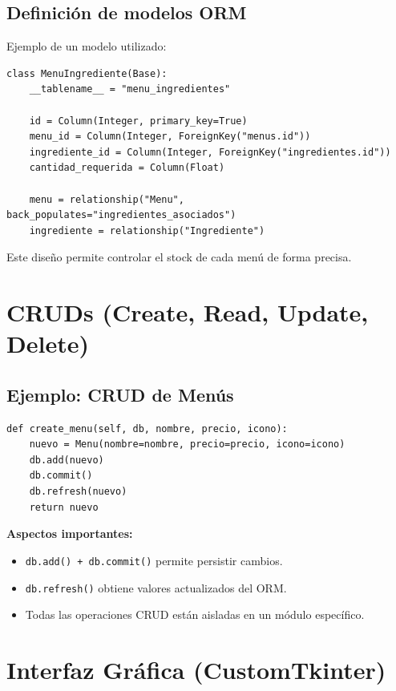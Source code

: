 \documentclass[11pt,letterpaper]{article}
\begin{document}
\subsection{Definición de modelos ORM}

Ejemplo de un modelo utilizado:

\begin{verbatim}
class MenuIngrediente(Base):
    __tablename__ = "menu_ingredientes"

    id = Column(Integer, primary_key=True)
    menu_id = Column(Integer, ForeignKey("menus.id"))
    ingrediente_id = Column(Integer, ForeignKey("ingredientes.id"))
    cantidad_requerida = Column(Float)

    menu = relationship("Menu", back_populates="ingredientes_asociados")
    ingrediente = relationship("Ingrediente")
\end{verbatim}

Este diseño permite controlar el stock de cada menú de forma precisa.

\section{CRUDs (Create, Read, Update, Delete)}

\subsection{Ejemplo: CRUD de Menús}

\begin{verbatim}
def create_menu(self, db, nombre, precio, icono):
    nuevo = Menu(nombre=nombre, precio=precio, icono=icono)
    db.add(nuevo)
    db.commit()
    db.refresh(nuevo)
    return nuevo
\end{verbatim}

\textbf{Aspectos importantes:}

\begin{itemize}
    \item \texttt{db.add() + db.commit()} permite persistir cambios.
    \item \texttt{db.refresh()} obtiene valores actualizados del ORM.
    \item Todas las operaciones CRUD están aisladas en un módulo específico.
\end{itemize}

\section{Interfaz Gráfica (CustomTkinter)}
\end{document}
